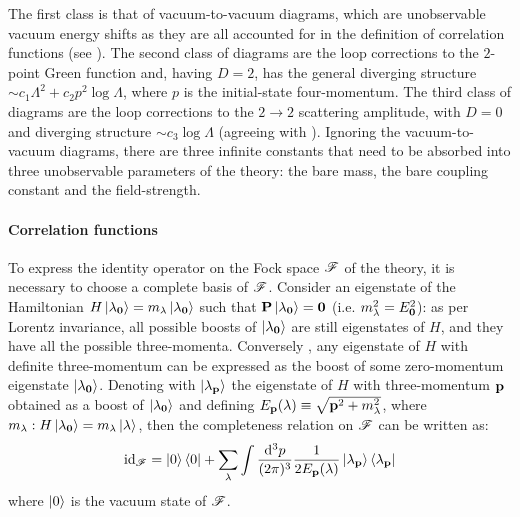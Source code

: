 The first class is that of vacuum-to-vacuum diagrams, which are unobservable vacuum energy shifts as they are all accounted for in the definition of correlation functions (see ).
The second class of diagrams are the loop corrections to the $ 2 $-point Green function and, having $ D = 2 $, has the general diverging structure $ \sim c_1 \Lambda^2 + c_2 p^2 \log \Lambda $, where $ p $ is the initial-state four-momentum.
The third class of diagrams are the loop corrections to the $ 2 \rightarrow 2 $ scattering amplitude, with $ D = 0 $ and diverging structure $ \sim c_3 \log \Lambda $ (agreeing with ).
Ignoring the vacuum-to-vacuum diagrams, there are three infinite constants that need to be absorbed into three unobservable parameters of the theory: the bare mass, the bare coupling constant and the field-strength.

\paragraph{Correlation functions}

To express the identity operator on the Fock space $ \mathscr{F} $ of the theory, it is necessary to choose a complete basis of $ \mathscr{F} $. Consider an eigenstate of the Hamiltonian $ H \ket{\lambda_{\mathbf{0}}} = m_\lambda \ket{\lambda_{\mathbf{0}}} $ such that $ \mathbf{P} \ket{\lambda_{\mathbf{0}}} = \mathbf{0} $ (i.e. $ m_\lambda^2 = E_{\mathbf{0}}^2 $): as per Lorentz invariance, all possible boosts of $ \ket{\lambda_{\mathbf{0}}} $ are still eigenstates of $ H $, and they have all the possible three-momenta. Conversely , any eigenstate of $ H $ with definite three-momentum can be expressed as the boost of some zero-momentum eigenstate $ \ket{\lambda_{\mathbf{0}}} $. Denoting with $ \ket{\lambda_{\mathbf{p}}} $ the eigenstate of $ H $ with three-momentum $ \mathbf{p} $ obtained as a boost of $ \ket{\lambda_{\mathbf{0}}} $ and defining $ E_{\mathbf{p}}(\lambda) \equiv \sqrt{\mathbf{p}^2 + m_\lambda^2} $, where $ m_\lambda : H \ket{\lambda_{\mathbf{0}}} = m_\lambda \ket{\lambda} $, then the completeness relation on $ \mathscr{F} $ can be written as\footnotemark:
\begin{equation}
  \operatorname{id}_{\mathscr{F}} = \ket{0}\bra{0} + \sum_\lambda \int \frac{\mathrm{d}^3p}{(2\pi)^3} \frac{1}{2E_{\mathbf{p}}(\lambda)} \ket{\lambda_{\mathbf{p}}}\bra{\lambda_{\mathbf{p}}}
\end{equation}
where $ \ket{0} $ is the vacuum state of $ \mathscr{F} $.


